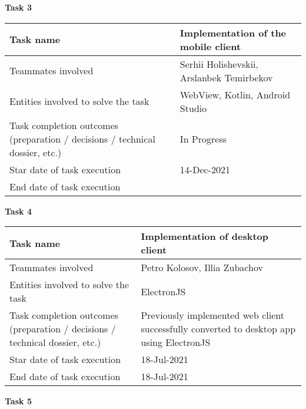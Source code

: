 \vskip 5mm
\hspace*{-6mm}\textbf{Task 3}\\[2mm]
\begin{tabular}{|p{}|p{}|}
    \hline
    Task name                                                                   & Implementation of the mobile client       \\
    \hline
    Teammates involved                                                          & Serhii Holishevskii, Arslanbek Temirbekov \\
    \hline
    Entities involved to solve the task                                         & WebView, Kotlin, Android Studio           \\
    \hline
    Task completion outcomes  (preparation / decisions / technical dossier, etc.) & In Progress                               \\
    \hline
    Star date of task execution                                                 & 14-Dec-2021                               \\
    \hline
    End date of task execution                                                  &                                           \\
    \hline
\end{tabular}
\vskip 5mm
\hspace*{-6mm}\textbf{Task 4}\\[2mm]
\begin{tabular}{|p{}|p{}|}
    \hline
    Task name                           & Implementation of desktop client \\
    \hline
    Teammates involved                  & Petro Kolosov, Illia Zubachov    \\
    \hline
    Entities involved to solve the task & ElectronJS                       \\
    \hline
    Task completion outcomes (preparation / decisions / technical dossier, etc.) & Previously implemented web client successfully converted to
    desktop app using ElectronJS \\
    \hline
    Star date of task execution         & 18-Jul-2021                      \\
    \hline
    End date of task execution          & 18-Jul-2021                      \\
    \hline
\end{tabular}
\vskip 5mm
\hspace*{-6mm}\textbf{Task 5}\\[2mm]
